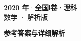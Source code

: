 \documentclass[zihao=-4, a4paper]{ctexart}
\begin{document}
\begin{center}
  {\Large\bfseries 2020 年·全国Ⅰ卷·理科}\\[4pt]
  {\large 数学 · 解析版}
\end{center}
\medskip
{}

\clearpage
{}
\begin{center}{\Large\bfseries 参考答案与详细解析}\end{center}
\medskip

\end{document}
